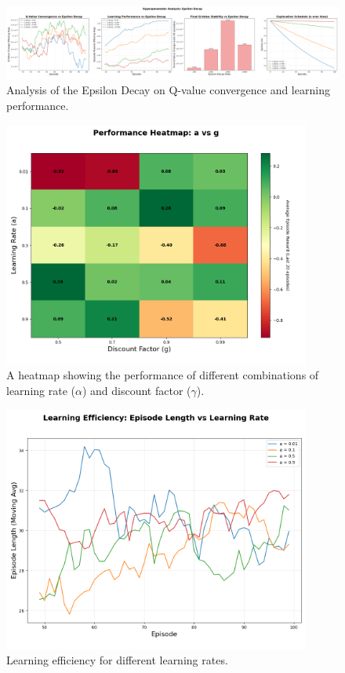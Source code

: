 \documentclass[11pt, a4paper]{article}
\begin{document}
\begin{figure}[H]
    \centering
    \includegraphics[width=\textwidth]{images/hyperparameter_analysis_epsilon_decay.png}
    \caption{Analysis of the Epsilon Decay on Q-value convergence and learning performance.}\label{fig:hyperparameter_epsilon}
\end{figure}

\begin{figure}[H]
    \centering
    \includegraphics[width=0.9\textwidth]{images/hyperparameter_heatmap.png}
    \caption{A heatmap showing the performance of different combinations of learning rate ($\alpha$) and discount factor ($\gamma$).}\label{fig:hyperparameter_heatmap}
\end{figure}

\begin{figure}[H]
    \centering
    \includegraphics[width=0.9\textwidth]{images/hyperparameter_efficiency.png}
    \caption{Learning efficiency for different learning rates.}\label{fig:hyperparameter_efficiency}
\end{figure}
\end{document}
